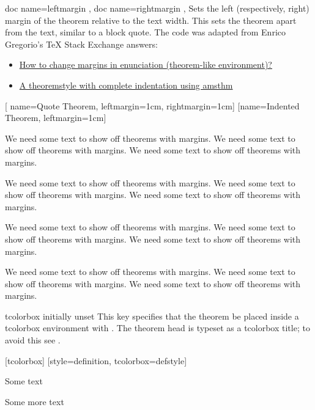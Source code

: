 \documentclass{ltxdoc}
\begin{document}
\begin{docKeys}[doc parameter={=\meta{length}}]
  {
    { doc name=leftmargin },
    { doc name=rightmargin },
  }
Sets the left (respectively, right) margin of the theorem relative to the text width.
This sets the theorem apart from the text, similar to a block quote. The code was adapted from Enrico Gregorio's \TeX{} Stack Exchange answers:
\begin{itemize}
	\item \href{https://tex.stackexchange.com/a/67251/208544}{How to change margins in enunciation (theorem-like environment)?}
	\item \href{https://tex.stackexchange.com/a/236407/208544}{A theoremstyle with complete indentation using amsthm}
\end{itemize}
\begin{codepreamble}
\newcommand{\marginthmtext}{%
  We need some text to show off theorems with margins. }
[
  name=Quote Theorem,
  leftmargin=1cm, rightmargin=1cm]
[name=Indented Theorem, leftmargin=1cm]
\end{codepreamble}

\newcommand{\marginthmtext}{We need some text to show off theorems with margins. }
\begin{keythmscode}[withpreamble]
\marginthmtext\marginthmtext\marginthmtext

\begin{quotethm}
\marginthmtext\marginthmtext\marginthmtext
\end{quotethm}

\marginthmtext\marginthmtext\marginthmtext

\begin{indentedthm}
\marginthmtext\marginthmtext\marginthmtext
\end{indentedthm}
\end{keythmscode}

\end{docKeys}

\begin{docKey}{tcolorbox}
  {}
  {initially unset}
This key specifies that the theorem be placed inside a tcolorbox environment with .
The theorem head is typeset as a tcolorbox title; to avoid this see .

\begin{codepreamble}
[tcolorbox]
[style=definition, tcolorbox={defstyle}]
\end{codepreamble}

\begin{keythmscode}[withpreamble]
\begin{corollary}
Some text
\end{corollary}
\begin{definition}
Some more text
\end{definition}
\end{keythmscode}

\end{docKey}
\end{document}
